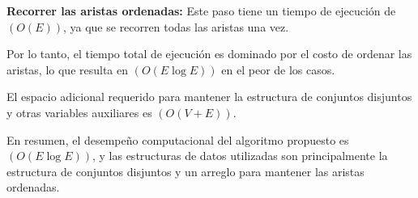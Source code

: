 \documentclass[answers, 11pt]{exam}
\begin{document}
\begin{questions}
\begin{solution}
    \textbf{Recorrer las aristas ordenadas:} Este paso tiene un tiempo de ejecución 
    de $(O(E))$, ya que se recorren todas las aristas una vez.

    Por lo tanto, el tiempo total de ejecución es dominado por el costo de ordenar 
    las aristas, lo que resulta en $(O(E \log E))$ en el peor de los casos.

    El espacio adicional requerido para mantener la estructura de conjuntos disjuntos 
    y otras variables auxiliares es $(O(V + E))$.

    En resumen, el desempeño computacional del algoritmo propuesto es 
    $(O(E \log E))$, y las estructuras de datos utilizadas son principalmente 
    la estructura de conjuntos disjuntos y un arreglo para mantener las aristas ordenadas.
  \end{solution}
  
\end{questions}
\end{document}
